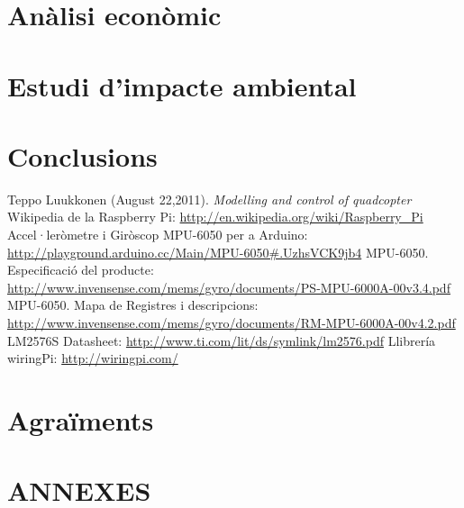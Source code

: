\documentclass[twoside]{article}
\begin{document}
\newpage
\section{Anàlisi econòmic}
\newpage

\section{Estudi d'impacte ambiental}
\newpage

\section*{Conclusions}
\newpage

\begin{thebibliography}{99}
 Teppo Luukkonen (August 22,2011). \textit{Modelling and control of quadcopter}
 Wikipedia de la Raspberry Pi: \url{http://en.wikipedia.org/wiki/Raspberry_Pi}
 Accel·leròmetre i Giròscop MPU-6050 per a Arduino: \url{http://playground.arduino.cc/Main/MPU-6050#.UzhsVCK9jb4}
 MPU-6050. Especificació del producte: \url{http://www.invensense.com/mems/gyro/documents/PS-MPU-6000A-00v3.4.pdf}
 MPU-6050. Mapa de Registres i descripcions: \url{http://www.invensense.com/mems/gyro/documents/RM-MPU-6000A-00v4.2.pdf}
 LM2576S Datasheet: \url{http://www.ti.com/lit/ds/symlink/lm2576.pdf}
 Llibrería wiringPi: \url{http://wiringpi.com/}
\end{thebibliography}{}
\newpage

\section*{Agraïments}
\newpage

\section*{ANNEXES}
\end{document}
